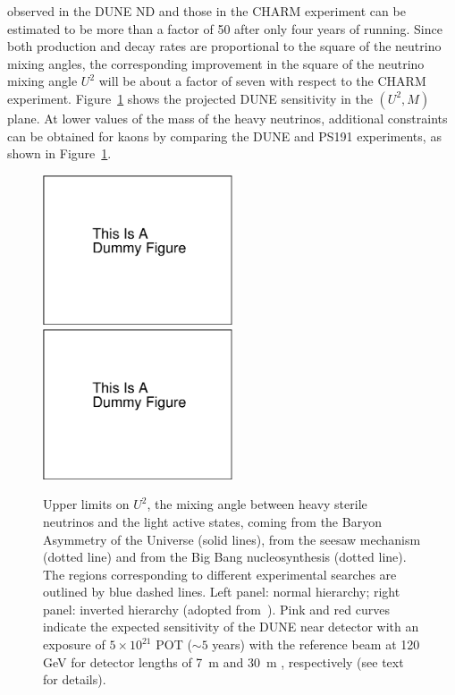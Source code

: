 observed in the DUNE ND and those in the CHARM experiment can be
estimated to be more than a factor of 50 after only four years of
running.  Since both production and decay rates are proportional to
the square of the neutrino mixing angles, the corresponding
improvement in the square of the neutrino mixing angle $U^2$ will be
about a factor of seven with respect to the CHARM
experiment. Figure~\ref{fig:heavynu} shows the projected DUNE
sensitivity in the $(U^2,M)$ plane.  At lower values of the mass of
the heavy neutrinos, additional constraints can be obtained for kaons
by comparing the DUNE and PS191 experiments, as shown in
Figure~\ref{fig:heavynu}.
%
\begin{figure}[!htb]
\centerline{
\includegraphics[width=0.5\textwidth]{graphics/dummy.pdf}
\includegraphics[width=0.5\textwidth]{graphics/dummy.pdf}}
\caption[Near detector constraints on heavy Majorana neutrinos]
{Upper limits on $U^2$, the mixing angle between heavy sterile
  neutrinos and the light active states, coming from the Baryon
  Asymmetry of the Universe (solid lines), from the seesaw mechanism
  (dotted line) and from the Big Bang nucleosynthesis (dotted
  line). The regions corresponding to different experimental searches
  are outlined by blue dashed lines. Left panel: normal hierarchy;
  right panel: inverted hierarchy (adopted
  from~\cite{Canetti:2010aw}).  Pink and red curves indicate the
  expected sensitivity of the DUNE near detector with an exposure of
  $5\times 10^{21}$ POT ($\sim 5$ years) with the 
  reference beam at 120 GeV for detector lengths of \SI{7}{m} and
  \SI{30}{m} , respectively (see text for details).}
\label{fig:heavynu}
\end{figure}
